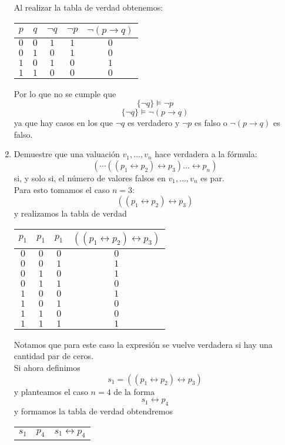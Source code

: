 \documentclass[letter]{article}
\begin{document}
\begin{pregunta}{1}
\begin{enumerate}
		Al realizar la tabla de verdad obtenemos:
		\begin{center}
		\begin{tabular}{c c|c|c c}
		$p$&$q$&$\neg q$&$\neg p$&$\neg(p\rightarrow q)$ \\
		\hline
		$0$&$0$&$1$&$1$&$0$\\
		$0$&$1$&$0$&$1$&$0$\\
		$1$&$0$&$1$&$0$&$1$\\
		$1$&$1$&$0$&$0$&$0$\\
		\end{tabular}
		\end{center}
		Por lo que no se cumple que 
		$$\{\neg q\} \vDash \neg p$$
		$$\{\neg q\} \vDash \neg(p\rightarrow q)$$
		ya que hay casos en los que $\neg q$ es verdadero y $\neg p$ es falso o $\neg (p\rightarrow q)$ es falso.
		\item Demuestre que una valuación $v_1,\dots, v_n$ hace verdadera a la fórmula:
		$$(\cdots ((p_1 \leftrightarrow p_2)\leftrightarrow p_3) \dots \leftrightarrow p_n) $$
		si, y solo si, el número de valores falsos en $v_1,\dots, v_n$ es par.\\
		Para esto tomamos el caso $n=3$:
		$$((p_1\leftrightarrow p_2)\leftrightarrow p_3)$$
		y realizamos la tabla de verdad
		\begin{center}
		\begin{tabular}{c c c|c}
		$p_1$&$p_1$&$p_1$&$((p_1\leftrightarrow p_2)\leftrightarrow p_3)$\\
		\hline
		$0$&$0$&$0$&$0$\\
		$0$&$0$&$1$&$1$\\
		$0$&$1$&$0$&$1$\\
		$0$&$1$&$1$&$0$\\
		$1$&$0$&$0$&$1$\\
		$1$&$0$&$1$&$0$\\
		$1$&$1$&$0$&$0$\\
		$1$&$1$&$1$&$1$\\
		\end{tabular}
		\end{center}
		Notamos que para este caso la expresión se vuelve verdadera si hay una cantidad par de ceros.\\
		Si ahora definimos 
		$$s_{1}=((p_1\leftrightarrow p_2)\leftrightarrow p_3)$$
		y planteamos el caso $n=4$ de la forma 
		$$s_{1}\leftrightarrow p_4$$
		y formamos la tabla de verdad obtendremos
		\begin{center}
		\begin{tabular}{c c|c}
		$s_1$&$p_4$&$s_{1}\leftrightarrow p_4$\\

\end{tabular}
\end{center}
\end{enumerate}
\end{pregunta}
\end{document}
